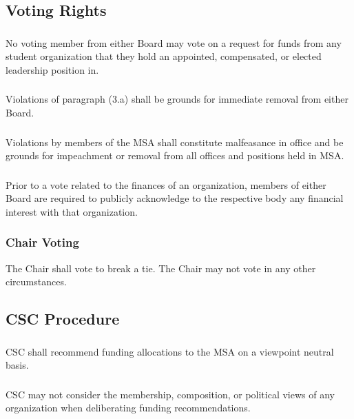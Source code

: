 \subsection{Voting Rights}
\subsubsection{}
No voting member from either Board may vote on a request for funds from any student organization that they hold an appointed, compensated, or elected leadership position in.
\subsubsection{}
Violations of paragraph (3.a) shall be grounds for immediate removal from either Board.
\subsubsection{}
Violations by members of the MSA shall constitute malfeasance in office and be grounds for impeachment or removal from all offices and positions held in MSA.
\subsubsection{}
Prior to a vote related to the finances of an organization, members of either Board are required to publicly acknowledge to the respective body any financial interest with that organization. 
\subsubsection{Chair Voting}
\subsubsubsection{}
The Chair shall vote to break a tie. 
\subsubsubsection{}
The Chair may not vote in any other circumstances.

\subsection{CSC Procedure}
\subsubsection{}
CSC shall recommend funding allocations to the MSA on a viewpoint neutral basis. 
\subsubsection{}
CSC may not consider the membership, composition, or political views of any organization when deliberating funding recommendations. 
